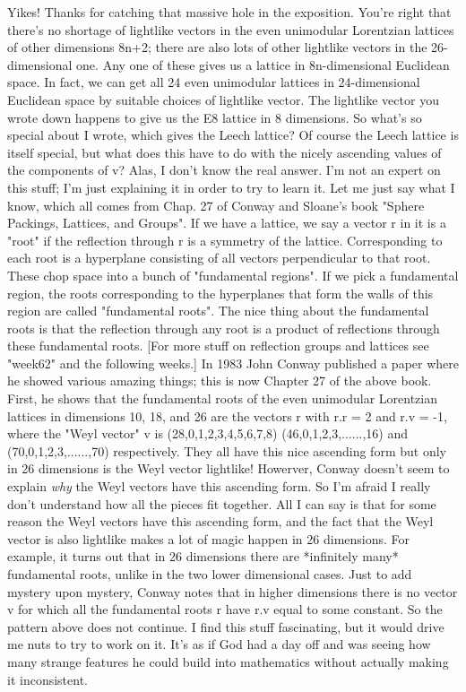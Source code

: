 Yikes!  Thanks for catching that massive hole in the exposition.
You're right that there's no shortage of lightlike vectors in
the even unimodular Lorentzian lattices of other dimensions 8n+2; there
are also lots of other lightlike vectors in the 26-dimensional one.
Any one of these gives us a lattice in 8n-dimensional Euclidean space.
In fact, we can get all 24 even unimodular lattices in 24-dimensional
Euclidean space by suitable choices of lightlike vector.   The lightlike
vector you wrote down happens to give us the E8 lattice in 8 dimensions.
So what's so special about I wrote, which gives the Leech lattice?  Of
course the Leech lattice is itself special, but what does this
have to do with the nicely ascending values of the components of v?
Alas, I don't know the real answer.  I'm not an expert on this
stuff; I'm just explaining it in order to try to learn it.  Let me
just say what I know, which all comes from Chap. 27 of Conway and
Sloane's book "Sphere Packings, Lattices, and Groups".
If we have a lattice, we say a vector r in it is a "root" if
the reflection through r is a symmetry of the lattice.   Corresponding
to each root is a hyperplane consisting of all vectors perpendicular
to that root.  These chop space into a bunch of "fundamental regions".
If we pick a fundamental region, the roots corresponding to the
hyperplanes that form the walls of this region are called "fundamental
roots".  The nice thing about the fundamental roots is that the
reflection through any root is a product of reflections through these
fundamental roots.
[For more stuff on reflection groups and lattices see "week62" and
the following weeks.]
In 1983 John Conway published a paper where he showed various
amazing things; this is now Chapter 27 of the above book.  First,
he shows that the fundamental roots of the even unimodular Lorentzian
lattices in dimensions 10, 18, and 26 are the vectors r with r.r = 2
and r.v = -1, where the "Weyl vector" v is
(28,0,1,2,3,4,5,6,7,8)
(46,0,1,2,3,......,16)
and
(70,0,1,2,3,......,70)
respectively.
They all have this nice ascending form but only in 26 dimensions
is the Weyl vector lightlike!
Howerver, Conway doesn't seem to explain \emph{why} the Weyl vectors have
this ascending form.  So I'm afraid I really don't understand how
all the pieces fit together.  All I can say is that for some reason
the Weyl vectors have this ascending form, and the fact that the Weyl
vector is also lightlike makes a lot of magic happen in 26 dimensions.
For example, it turns out that in 26 dimensions there are *infinitely
many* fundamental roots, unlike in the two lower dimensional cases.
Just to add mystery upon mystery, Conway notes that in higher dimensions
there is no vector v for which all the fundamental roots r have
r.v equal to some constant.  So the pattern above does not continue.
I find this stuff fascinating, but it would drive me nuts to try
to work on it.  It's as if God had a day off and was seeing how many
strange features he could build into mathematics without actually
making it inconsistent.

